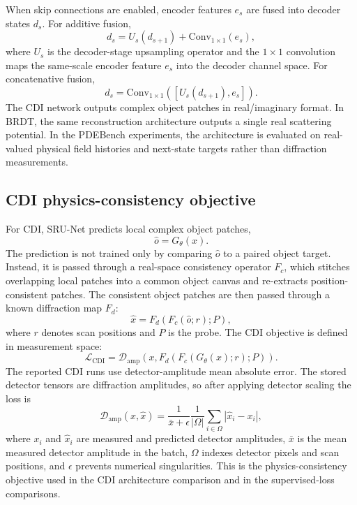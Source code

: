 \documentclass[11pt]{article}
\newcommand{\ConvOO}{\mathrm{Conv}_{1\times 1}}
\begin{document}
When skip connections are enabled, encoder features $e_s$ are fused into decoder
states $d_s$. For additive fusion,
\begin{equation}
  d_s = U_s(d_{s+1}) + \ConvOO(e_s),
\end{equation}
where $U_s$ is the decoder-stage upsampling operator and the $1\times1$
convolution maps the same-scale encoder feature $e_s$ into the decoder channel
space.
For concatenative fusion,
\begin{equation}
  d_s = \ConvOO\left([U_s(d_{s+1}), e_s]\right).
\end{equation}
The CDI network outputs complex object patches in real/imaginary format. In
BRDT, the same reconstruction architecture outputs a single real scattering
potential. In the PDEBench experiments, the architecture is evaluated on
real-valued physical field histories and next-state targets rather than
diffraction measurements.

\subsection{CDI physics-consistency objective}

For CDI, SRU-Net predicts local complex object patches,
\begin{equation}
  \hat{o} = G_{\theta}(x).
\end{equation}
The prediction is not trained only by comparing $\hat{o}$ to a paired object
target. Instead, it is passed through a real-space consistency operator $F_c$,
which stitches overlapping local patches into a common object canvas and
re-extracts position-consistent patches. The consistent object patches are then
passed through a known diffraction map $F_d$:
\begin{equation}
  \hat{x}
  = F_d\left(F_c(\hat{o}; r); P\right),
\end{equation}
where $r$ denotes scan positions and $P$ is the probe. The CDI objective is
defined in measurement space:
\begin{equation}
  \mathcal{L}_{\mathrm{CDI}}
  = \mathcal{D}_{\mathrm{amp}}\left(x, F_d(F_c(G_{\theta}(x); r); P)\right).
\end{equation}
The reported CDI runs use detector-amplitude mean absolute error. The stored
detector tensors are diffraction amplitudes, so after applying detector scaling
the loss is
\begin{equation}
  \mathcal{D}_{\mathrm{amp}}(x,\hat{x})
  =
  \frac{1}{\bar{x}+\epsilon}
  \frac{1}{|\Omega|}
  \sum_{i\in\Omega} \left|\hat{x}_i - x_i\right|,
\end{equation}
where $x_i$ and $\hat{x}_i$ are measured and predicted detector amplitudes,
$\bar{x}$ is the mean measured detector amplitude in the batch, $\Omega$ indexes
detector pixels and scan positions, and $\epsilon$ prevents numerical
singularities. This is the physics-consistency objective used in the CDI
architecture comparison and in the supervised-loss comparisons.
\end{document}
